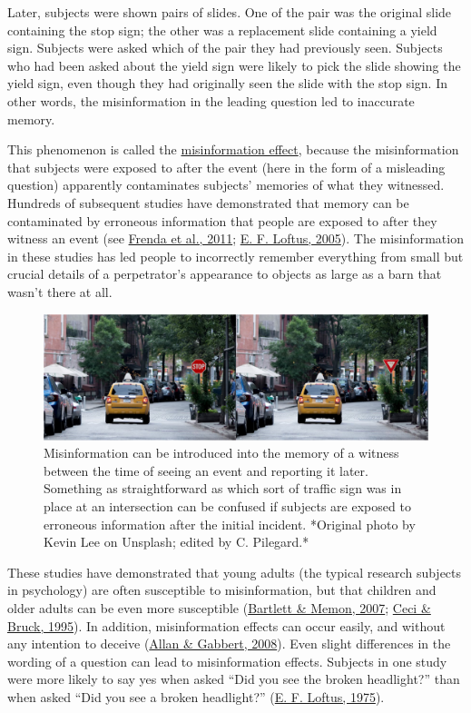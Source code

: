 \documentclass[
]{krantz}
\begin{document}
Later, subjects were shown pairs of slides. One of the pair was the original slide containing the stop sign; the other was a replacement slide containing a yield sign. Subjects were asked which of the pair they had previously seen. Subjects who had been asked about the yield sign were likely to pick the slide showing the yield sign, even though they had originally seen the slide with the stop sign. In other words, the misinformation in the leading question led to inaccurate memory.

This phenomenon is called the \protect\hyperlink{misinformation-effect}{misinformation effect}, because the misinformation that subjects were exposed to after the event (here in the form of a misleading question) apparently contaminates subjects' memories of what they witnessed. Hundreds of subsequent studies have demonstrated that memory can be contaminated by erroneous information that people are exposed to after they witness an event (see \protect\hyperlink{ref-frenda2011current}{Frenda et al., 2011}; \protect\hyperlink{ref-loftus2005planting}{E. F. Loftus, 2005}). The misinformation in these studies has led people to incorrectly remember everything from small but crucial details of a perpetrator's appearance to objects as large as a barn that wasn't there at all.

\begin{figure}

{\centering \includegraphics[width=0.8\linewidth]{images/ch6/fig2} 

}

\caption{Misinformation can be introduced into the memory of a witness between the time of seeing an event and reporting it later. Something as straightforward as which sort of traffic sign was in place at an intersection can be confused if subjects are exposed to erroneous information after the initial incident. *Original photo by Kevin Lee on Unsplash; edited by C. Pilegard.*}\label{fig:trafficsign}
\end{figure}

These studies have demonstrated that young adults (the typical research subjects in psychology) are often susceptible to misinformation, but that children and older adults can be even more susceptible (\protect\hyperlink{ref-bartlett2007eyewitness}{Bartlett \& Memon, 2007}; \protect\hyperlink{ref-ceci1995jeopardy}{Ceci \& Bruck, 1995}). In addition, misinformation effects can occur easily, and without any intention to deceive (\protect\hyperlink{ref-allan2008still}{Allan \& Gabbert, 2008}). Even slight differences in the wording of a question can lead to misinformation effects. Subjects in one study were more likely to say yes when asked ``Did you see the broken headlight?'' than when asked ``Did you see a broken headlight?'' (\protect\hyperlink{ref-loftus1975leading}{E. F. Loftus, 1975}).
\end{document}
